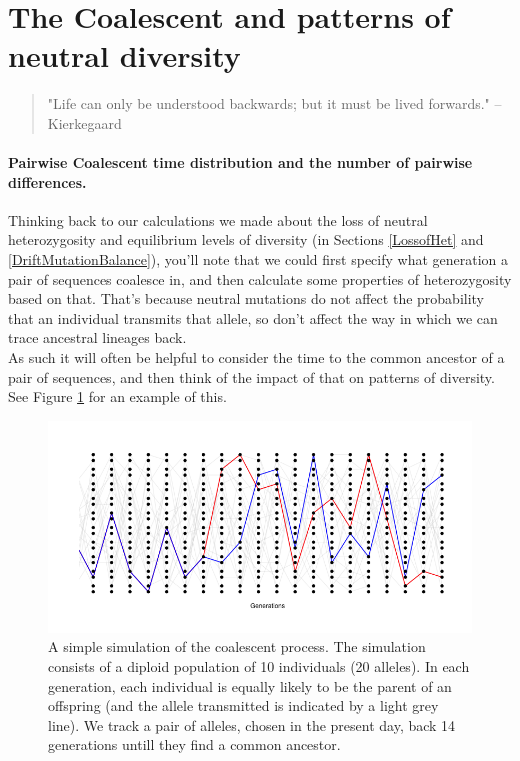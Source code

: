 \section{The Coalescent and patterns of neutral diversity}

\begin{quote}
"Life can only be understood backwards; but it must be lived
forwards." -- Kierkegaard
\end{quote}

\paragraph{Pairwise Coalescent time distribution and the number of
 pairwise differences.}
Thinking back to our calculations we made about the loss of neutral heterozygosity
and equilibrium levels of diversity (in Sections \ref{LossofHet} and \ref{DriftMutationBalance}), you'll note that we could first specify
what generation a pair of sequences coalesce in, and then calculate
some properties of heterozygosity based on that. That's because neutral
mutations do not affect the probability that an individual transmits
that allele, so don't affect the way in which we can trace ancestral lineages
back. \\


As such it will often be helpful to consider the time to the common
ancestor of a pair of sequences, and then think of the impact of that
on patterns of diversity. See Figure \ref{fig:Coalescent_simulation}
for an example of this. 

\begin{figure}
\begin{center}
\includegraphics[width=\textwidth]{figures/Coalescent.png}
\end{center}
\caption{A simple simulation of the coalescent process. The simulation
  consists of a diploid population of 10 individuals (20 alleles). In
  each generation, each individual is equally likely to be the parent
  of an offspring (and the allele transmitted is indicated by a light
  grey line).  We track a
  pair of alleles, chosen in the present day, back 14 generations
  untill they find a common ancestor.} \label{fig:Coalescent_simulation}
\end{figure}


